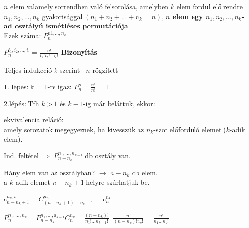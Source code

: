 \begin{frame}
  \begin{tcolorbox}[title={Def.: Ismétléses Permutáció}]
      $n$ elem valamely sorrendben való felsorolása, amelyben $k$ elem fordul elő rendre $n_1, n_2, ..., n_k$ gyakorisággal $(n_1 + n_2 + ... + n_k = n)$, \textbf{$n$ elem egy $n_1, n_2, ..., n_k$-ad osztályú ismétléses permutációja}.\\
      Ezek száma: $P_n^{n1, ..., n_k}$
  \end{tcolorbox}

  \begin{tcolorbox}[title={Tétel: Ismétléses permutációk száma}]
    $P_n^{i_1, i_2, ..., i_r} = \frac{n!}{i_1!i_2!...i_r!}$
  \tcblower
    \textbf{Bizonyítás}\\
    \mmedskip

    Teljes indukcció $k$ szerint , $n$ rögzített\\
    \mmedskip

    1. lépés: k = 1-re igaz: $P_n^n = \frac{n!}{n!} = 1$\\
    \mbigskip

    2.lépés: Tfh $k > 1$ és $k - 1$-ig már beláttuk, ekkor:\\
    \msmallskip

    ekvivalencia reláció:\\
    amely sorozatok megegyeznek, ha kivesszük az $n_k$-szor előforduló elemet ($k$-adik elem).\\
    \msmallskip

    Ind. feltétel $\Rightarrow$ $P_{n - n_k}^{n_1, ..., n_{k - 1}}$ db osztály van.\\
    \msmallskip

    Hány elem van az osztályban? $\rightarrow$ $n - n_k$ db elem.\\
    a $k$-adik elemet $n - n_k + 1$ helyre szúrhatjuk be.\\
    \mmedskip

    $c_{n - n_k + 1}^{n_k, i} = C^{n_n}_{(n - n_k + 1) + n_k - 1} = c_n^{n_k}$\\
    \mmedskip

    $P_n^{n_1, ..., n_k} = P_{n - n_k}^{n_1, ..., n_{k - 1}} C_n^{n_k} = \frac{(n - n_k)!}{n_1!...n_{k - 1}!} \cdot \frac{n!}{(n - n_k)!n_k!} = \frac{n!}{n_1...n_k!}$
  \end{tcolorbox}
\end{frame}

